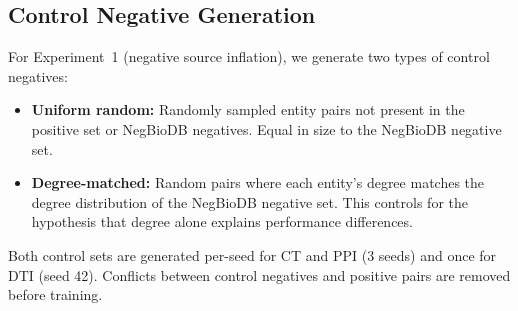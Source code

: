 \subsection{Control Negative Generation}

For Experiment~1 (negative source inflation), we generate two types of control negatives:

\begin{itemize}[nosep,leftmargin=*]
    \item \textbf{Uniform random:} Randomly sampled entity pairs not present in the positive set or NegBioDB negatives. Equal in size to the NegBioDB negative set.
    \item \textbf{Degree-matched:} Random pairs where each entity's degree matches the degree distribution of the NegBioDB negative set. This controls for the hypothesis that degree alone explains performance differences.
\end{itemize}

Both control sets are generated per-seed for CT and PPI (3 seeds) and once for DTI (seed 42). Conflicts between control negatives and positive pairs are removed before training.
